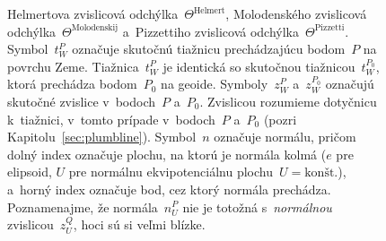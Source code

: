 \documentclass[a4paper, 12pt]{book}
\begin{document}
\begin{figure}[bt]
\centering

\caption{Helmertova zvislicová odchýlka~$\Theta^\textrm{Helmert}$, Molodenského 
zvislicová odchýlka~$\Theta^\textrm{Molodenskij}$ a~Pizzettiho zvislicová 
odchýlka~$\Theta^\textrm{Pizzetti}$.  Symbol~$t_W^P$ označuje skutočnú tiažnicu 
prechádzajúcu bodom~$P$ na povrchu Zeme.  Tiažnica~$t_W^P$ je identická so 
skutočnou tiažnicou~$t_W^{P_0}$, ktorá prechádza bodom~$P_0$ na geoide.  
Symboly~$z_W^P$ a~$z_W^{P_0}$ označujú skutočné zvislice v~bodoch~$P$ a~$P_0$.  
Zvislicou rozumieme dotyčnicu k~tiažnici, v~tomto prípade v~bodoch~$P$ a~$P_0$ 
(pozri Kapitolu~\ref{sec:plumbline}).  Symbol~$n$ označuje normálu, pričom 
dolný index označuje plochu, na ktorú je normála kolmá ($e$ pre elipsoid, $U$ 
pre normálnu ekvipotenciálnu plochu~$U = \textrm{kon\v{s}t.}$), a~horný index 
označuje bod, cez ktorý normála prechádza.  Poznamenajme, že normála~$n_U^P$ 
nie je totožná s~\emph{normálnou} zvislicou~$z_U^Q$, hoci sú si veľmi blízke.}
\label{fig:deflections}
\end{figure}
\end{document}
